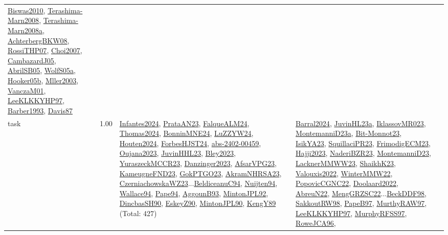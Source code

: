 {\begin{longtable}{p{3cm}r>{\raggedright\arraybackslash}p{6cm}>{\raggedright\arraybackslash}p{6cm}>{\raggedright\arraybackslash}p{8cm}}
\hyperref[detail:Biswas2010]{Biswas2010}, \hyperref[detail:Terashima-Marn2008]{Terashima-Marn2008}, \hyperref[detail:Terashima-Marn2008a]{Terashima-Marn2008a}, \hyperref[detail:AchterbergBKW08]{AchterbergBKW08}, \hyperref[detail:RossiTHP07]{RossiTHP07}, \hyperref[detail:Choi2007]{Choi2007}, \hyperref[detail:CambazardJ05]{CambazardJ05}, \hyperref[detail:AbrilSB05]{AbrilSB05}, \hyperref[detail:WolfS05a]{WolfS05a}, \hyperref[detail:Hooker05b]{Hooker05b}, \hyperref[detail:Mller2003]{Mller2003}, \hyperref[detail:VanczaM01]{VanczaM01}, \hyperref[detail:LeeKLKKYHP97]{LeeKLKKYHP97}, \hyperref[detail:Barber1993]{Barber1993}, \hyperref[detail:Davis87]{Davis87}\\
\index{task}\index{Scheduling!task}task &  1.00 & \hyperref[detail:Infantes2024]{Infantes2024}, \hyperref[detail:PrataAN23]{PrataAN23}, \hyperref[detail:FalqueALM24]{FalqueALM24}, \hyperref[detail:Thomas2024]{Thomas2024}, \hyperref[detail:BonninMNE24]{BonninMNE24}, \hyperref[detail:LuZZYW24]{LuZZYW24}, \hyperref[detail:Houten2024]{Houten2024}, \hyperref[detail:ForbesHJST24]{ForbesHJST24}, \hyperref[detail:abs-2402-00459]{abs-2402-00459}, \hyperref[detail:Oujana2023]{Oujana2023}, \hyperref[detail:JuvinHHL23]{JuvinHHL23}, \hyperref[detail:Bley2023]{Bley2023}, \hyperref[detail:YuraszeckMCCR23]{YuraszeckMCCR23}, \hyperref[detail:Danzinger2023]{Danzinger2023}, \hyperref[detail:AfsarVPG23]{AfsarVPG23}, \hyperref[detail:KameugneFND23]{KameugneFND23}, \hyperref[detail:GokPTGO23]{GokPTGO23}, \hyperref[detail:AkramNHRSA23]{AkramNHRSA23}, \hyperref[detail:CzerniachowskaWZ23]{CzerniachowskaWZ23}...\hyperref[detail:BeldiceanuC94]{BeldiceanuC94}, \hyperref[detail:Nuijten94]{Nuijten94}, \hyperref[detail:Wallace94]{Wallace94}, \hyperref[detail:Pape94]{Pape94}, \hyperref[detail:AggounB93]{AggounB93}, \hyperref[detail:MintonJPL92]{MintonJPL92}, \hyperref[detail:DincbasSH90]{DincbasSH90}, \hyperref[detail:EskeyZ90]{EskeyZ90}, \hyperref[detail:MintonJPL90]{MintonJPL90}, \hyperref[detail:KengY89]{KengY89} (Total: 427) & \hyperref[detail:Barral2024]{Barral2024}, \hyperref[detail:JuvinHL23a]{JuvinHL23a}, \hyperref[detail:IklassovMR023]{IklassovMR023}, \hyperref[detail:MontemanniD23a]{MontemanniD23a}, \hyperref[detail:Bit-Monnot23]{Bit-Monnot23}, \hyperref[detail:IsikYA23]{IsikYA23}, \hyperref[detail:SquillaciPR23]{SquillaciPR23}, \hyperref[detail:FrimodigECM23]{FrimodigECM23}, \hyperref[detail:Hajji2023]{Hajji2023}, \hyperref[detail:NaderiBZR23]{NaderiBZR23}, \hyperref[detail:MontemanniD23]{MontemanniD23}, \hyperref[detail:LacknerMMWW23]{LacknerMMWW23}, \hyperref[detail:ShaikhK23]{ShaikhK23}, \hyperref[detail:Valouxis2022]{Valouxis2022}, \hyperref[detail:WinterMMW22]{WinterMMW22}, \hyperref[detail:PopovicCGNC22]{PopovicCGNC22}, \hyperref[detail:Doolaard2022]{Doolaard2022}, \hyperref[detail:AbreuN22]{AbreuN22}, \hyperref[detail:MengGRZSC22]{MengGRZSC22}...\hyperref[detail:BeckDDF98]{BeckDDF98}, \hyperref[detail:SakkoutRW98]{SakkoutRW98}, \hyperref[detail:PapeB97]{PapeB97}, \hyperref[detail:MurthyRAW97]{MurthyRAW97}, \hyperref[detail:LeeKLKKYHP97]{LeeKLKKYHP97}, \hyperref[detail:MurphyRFSS97]{MurphyRFSS97}, \hyperref[detail:RoweJCA96]{RoweJCA96}, 
\end{longtable}}
